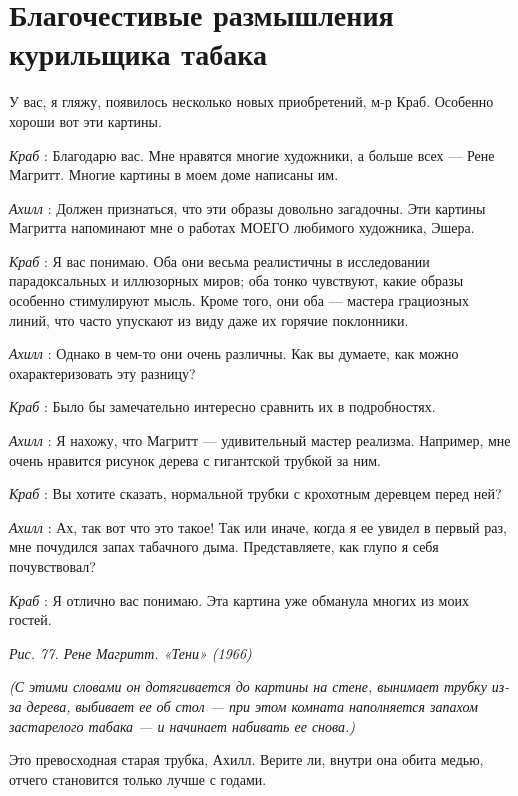 \documentclass[../main.tex]{subfiles}
\begin{document}
\section{Благочестивые размышления курильщика табака}


\begin{dialogue}

 У вас, я гляжу, появилось несколько новых приобретений, м-р Краб. Особенно хороши вот эти картины.

\emph{Краб} : Благодарю вас. Мне нравятся многие художники, а больше всех --- Рене Магритт. Многие картины в моем доме написаны им.

\emph{Ахилл} : Должен признаться, что эти образы довольно загадочны. Эти картины Магритта напоминают мне о работах МОЕГО любимого художника, Эшера.

\emph{Краб} : Я вас понимаю. Оба они весьма реалистичны в исследовании парадоксальных и иллюзорных миров; оба тонко чувствуют, какие образы особенно стимулируют мысль. Кроме того, они оба --- мастера грациозных линий, что часто упускают из виду даже их горячие поклонники.

\emph{Ахилл} : Однако в чем-то они очень различны. Как вы думаете, как можно охарактеризовать эту разницу?

\emph{Краб} : Было бы замечательно интересно сравнить их в подробностях.

\emph{Ахилл} : Я нахожу, что Магритт --- удивительный мастер реализма. Например, мне очень нравится рисунок дерева с гигантской трубкой за ним.

\emph{Краб} : Вы хотите сказать, нормальной трубки с крохотным деревцем перед ней?

\emph{Ахилл} : Ах, так вот что это такое! Так или иначе, когда я ее увидел в первый раз, мне почудился запах табачного дыма. Представляете, как глупо я себя почувствовал?

\emph{Краб} : Я отлично вас понимаю. Эта картина уже обманула многих из моих гостей.

\emph{Рис. 77. Рене Магритт. «Тени» (1966)}

\emph{(С этими словами он дотягивается до картины на стене, вынимает трубку из-за дерева, выбивает ее об стол --- при этом комната наполняется запахом застарелого табака --- и начинает набивать ее снова.)}

Это превосходная старая трубка, Ахилл. Верите ли, внутри она обита медью, отчего становится только лучше с годами.


\end{dialogue}
\end{document}
